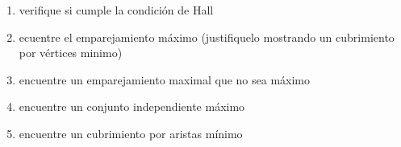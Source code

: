 \documentclass[10pt,a4paper]{article} %
\begin{document}
            \begin{enumerate}
                \item {verifique si cumple la condición de Hall}
                \item {ecuentre el emparejamiento máximo (justifiquelo
                    mostrando un cubrimiento por vértices minimo)}
                \item {encuentre un emparejamiento maximal que no sea máximo}
                \item {encuentre un conjunto independiente máximo }
                \item {encuentre un cubrimiento por aristas mínimo}
            \end{enumerate}



































    \nocite{*}
    
    
\end{document}
